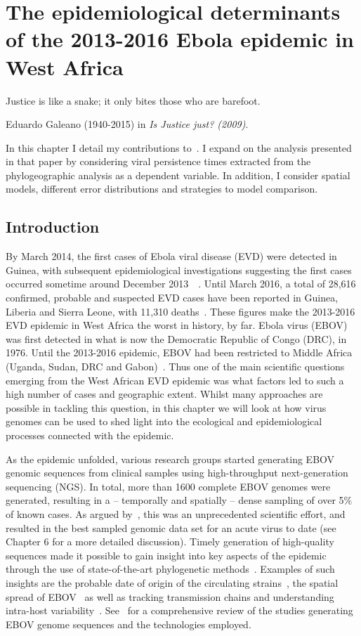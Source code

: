 \chapter{The epidemiological determinants of the 2013-2016 Ebola
epidemic in West Africa}
\epigraph{Justice is like a snake; it only bites those who are barefoot.}{Eduardo Galeano (1940-2015) in \textit{Is Justice just? (2009)}.}


In this chapter I detail my contributions to~\cite{Dudas2017}.
I expand on the analysis presented in that paper by considering viral persistence times extracted from the phylogeographic analysis as a dependent variable.
In addition, I consider spatial models, different error distributions and strategies to model comparison.

\section{Introduction}

By March 2014, the first cases of Ebola viral disease (EVD) were detected in Guinea, with subsequent epidemiological investigations suggesting the first cases occurred sometime around December 2013~~\citep{Baize2014}.
Until March 2016, a total of 28,616 confirmed, probable and suspected EVD cases have been reported in Guinea, Liberia and Sierra Leone, with 11,310 deaths~\citep{WHO2016}.
These figures make the 2013-2016 EVD epidemic in West Africa the worst in history, by far.
Ebola virus (EBOV) was first detected in what is now the Democratic Republic of Congo (DRC), in 1976.
Until the 2013-2016 epidemic, EBOV had been restricted to  Middle Africa (Uganda, Sudan, DRC and Gabon)~\citep{CDC2015}.
Thus one of the main scientific questions emerging from the West African EVD epidemic was what factors led to such a high number of cases and geographic extent.
Whilst many approaches are possible in tackling this question, in this chapter we will look at how virus genomes can be used to shed light into the ecological and epidemiological processes connected with the epidemic.

As the epidemic unfolded, various research groups started generating EBOV genomic sequences from clinical samples using high-throughput next-generation sequencing (NGS).
In total, more than 1600 complete EBOV genomes were generated, resulting in a -- temporally and spatially --  dense sampling of over 5\% of known cases.
As argued by~\cite{Holmes2016}, this was an unprecedented scientific effort, and resulted in the best sampled genomic data set for an acute virus to date (see Chapter 6 for a more detailed discussion).
Timely generation of high-quality sequences made it possible to gain insight into key aspects of the epidemic through the use of state-of-the-art phylogenetic methods~\citep{Dudas2014,Gire2014,Carroll2015,Park2015}.
Examples of such insights are the probable date of origin of the circulating strains~\citep{Gire2014, Park2015}, the spatial spread of EBOV~\citep{Carroll2015,Dudas2017} as well as tracking transmission chains and understanding intra-host variability~\citep{Park2015}.
See~\cite{Holmes2016} for a comprehensive review of the studies generating EBOV genome sequences and the technologies employed.


